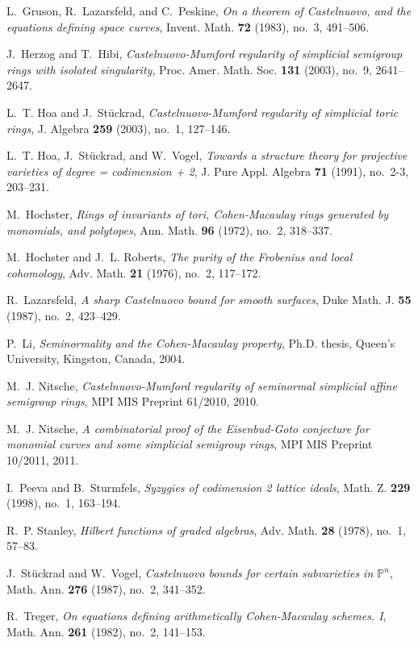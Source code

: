 \documentclass[11pt,a4paper]{amsart}%
\theoremstyle{definition}
\theoremstyle{remark}
\numberwithin{equation}{section}
\theoremstyle{plain}
\begin{document}
\begin{thebibliography}{00}
L.~Gruson, R.~Lazarsfeld, and C.~Peskine, \emph{{On a theorem of Castelnuovo,
  and the equations defining space curves}}, Invent. Math. \textbf{72} (1983),
  no.~3, 491--506.

J.~Herzog and T.~Hibi, \emph{{Castelnuovo-Mumford regularity of simplicial
  semigroup rings with isolated singularity}}, Proc. Amer. Math. Soc.
  \textbf{131} (2003), no.~9, 2641--2647.

L.~T. Hoa and J.~St{\"u}ckrad, \emph{{Castelnuovo-Mumford regularity of
  simplicial toric rings}}, J. Algebra \textbf{259} (2003), no.~1, 127--146.

L.~T. Hoa, J.~St\"uckrad, and W.~Vogel, \emph{Towards a structure theory for
  projective varieties of degree = codimension + 2}, J. Pure Appl. Algebra
  \textbf{71} (1991), no.~2-3, 203--231.

M.~Hochster, \emph{{Rings of invariants of tori, Cohen-Macaulay rings generated
  by monomials, and polytopes}}, Ann. Math. \textbf{96} (1972), no.~2,
  318--337.

M.~Hochster and J.~L. Roberts, \emph{{The purity of the Frobenius and local
  cohomology}}, Adv. Math. \textbf{21} (1976), no.~2, 117--172.

R.~Lazarsfeld, \emph{{A sharp Castelnuovo bound for smooth surfaces}}, Duke
  Math. J. \textbf{55} (1987), no.~2, 423--429.

P.~Li, \emph{{Seminormality and the Cohen-Macaulay property}}, Ph.D. thesis,
  Queen's University, Kingston, Canada, 2004.

M.~J. Nitsche, \emph{{Castelnuovo-Mumford regularity of seminormal simplicial
  affine semigroup rings}}, MPI MIS Preprint 61/2010, 2010.

M.~J. Nitsche, \emph{{A combinatorial proof of the Eisenbud-Goto conjecture for
  monomial curves and some simplicial semigroup rings}}, MPI MIS Preprint
  10/2011, 2011.

I.~Peeva and B.~Sturmfels, \emph{Syzygies of codimension 2 lattice ideals},
  Math. Z. \textbf{229} (1998), no.~1, 163--194.
  
R.~P. Stanley, \emph{Hilbert functions of graded algebras}, Adv. Math.
  \textbf{28} (1978), no.~1, 57--83.

J.~St\"uckrad and W.~Vogel, \emph{{Castelnuovo bounds for certain subvarieties
  in $\mathbb P^n$}}, Math. Ann. \textbf{276} (1987), no.~2, 341--352.

R.~Treger, \emph{{On equations defining arithmetically Cohen-Macaulay schemes.
  I}}, Math. Ann. \textbf{261} (1982), no.~2, 141--153.


\end{thebibliography}
\end{document}
